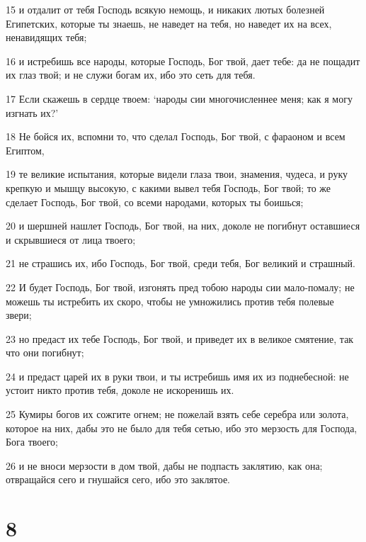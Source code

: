 \par 15 и отдалит от тебя Господь всякую немощь, и никаких лютых болезней Египетских, которые ты знаешь, не наведет на тебя, но наведет их на всех, ненавидящих тебя;
\par 16 и истребишь все народы, которые Господь, Бог твой, дает тебе: да не пощадит их глаз твой; и не служи богам их, ибо это сеть для тебя.
\par 17 Если скажешь в сердце твоем: `народы сии многочисленнее меня; как я могу изгнать их?'
\par 18 Не бойся их, вспомни то, что сделал Господь, Бог твой, с фараоном и всем Египтом,
\par 19 те великие испытания, которые видели глаза твои, знамения, чудеса, и руку крепкую и мышцу высокую, с какими вывел тебя Господь, Бог твой; то же сделает Господь, Бог твой, со всеми народами, которых ты боишься;
\par 20 и шершней нашлет Господь, Бог твой, на них, доколе не погибнут оставшиеся и скрывшиеся от лица твоего;
\par 21 не страшись их, ибо Господь, Бог твой, среди тебя, Бог великий и страшный.
\par 22 И будет Господь, Бог твой, изгонять пред тобою народы сии мало-помалу; не можешь ты истребить их скоро, чтобы не умножились против тебя полевые звери;
\par 23 но предаст их тебе Господь, Бог твой, и приведет их в великое смятение, так что они погибнут;
\par 24 и предаст царей их в руки твои, и ты истребишь имя их из поднебесной: не устоит никто против тебя, доколе не искоренишь их.
\par 25 Кумиры богов их сожгите огнем; не пожелай взять себе серебра или золота, которое на них, дабы это не было для тебя сетью, ибо это мерзость для Господа, Бога твоего;
\par 26 и не вноси мерзости в дом твой, дабы не подпасть заклятию, как она; отвращайся сего и гнушайся сего, ибо это заклятое.

\chapter{8}

